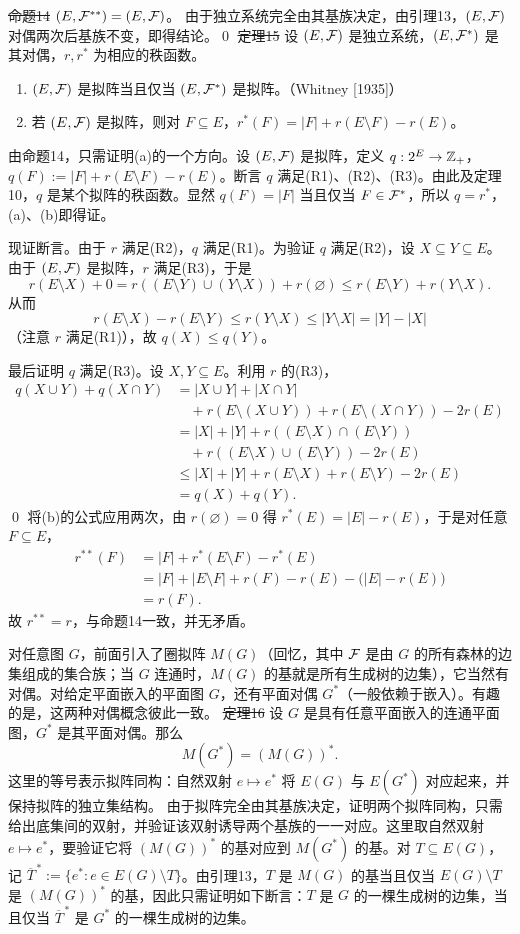 \st{命题14} $(E,\mathcal F^{**})=(E,\mathcal F)$。
\pr 由于独立系统完全由其基族决定，由引理13，$(E,\mathcal F)$ 对偶两次后基族不变，即得结论。\qed
\st{定理15} 设 $(E,\mathcal F)$ 是独立系统，$(E,\mathcal F^*)$ 是其对偶，$r,r^*$ 为相应的秩函数。
\begin{enumerate}[label=(\alph*)]
\item $(E,\mathcal F)$ 是拟阵当且仅当 $(E,\mathcal F^*)$ 是拟阵。（Whitney [1935]）
\item 若 $(E,\mathcal F)$ 是拟阵，则对 $F\subseteq E$，$r^*(F)=|F|+r(E\setminus F)-r(E)$。
\end{enumerate}
\pr 由命题14，只需证明(a)的一个方向。设 $(E,\mathcal F)$ 是拟阵，定义 $q:2^E\to\mathbb Z_+$，$q(F):=|F|+r(E\setminus F)-r(E)$。断言 $q$ 满足(R1)、(R2)、(R3)。由此及定理10，$q$ 是某个拟阵的秩函数。显然 $q(F)=|F|$ 当且仅当 $F\in\mathcal F^*$，所以 $q=r^*$，(a)、(b)即得证。

现证断言。由于 $r$ 满足(R2)，$q$ 满足(R1)。为验证 $q$ 满足(R2)，设 $X\subseteq Y\subseteq E$。由于 $(E,\mathcal F)$ 是拟阵，$r$ 满足(R3)，于是
\[r(E\setminus X)+0=r((E\setminus Y)\cup(Y\setminus X))+r(\varnothing)
\le r(E\setminus Y)+r(Y\setminus X).\]
从而
\[r(E\setminus X)-r(E\setminus Y)\le r(Y\setminus X)\le|Y\setminus X|=|Y|-|X|\]
（注意 $r$ 满足(R1)），故 $q(X)\le q(Y)$。

最后证明 $q$ 满足(R3)。设 $X,Y\subseteq E$。利用 $r$ 的(R3)，
\begin{align*}
q(X\cup Y)+q(X\cap Y)
&=|X\cup Y|+|X\cap Y|\\
&\quad+r(E\setminus(X\cup Y))+r(E\setminus(X\cap Y))-2r(E)\\
&=|X|+|Y|+r((E\setminus X)\cap(E\setminus Y))\\
&\quad+r((E\setminus X)\cup(E\setminus Y))-2r(E)\\
&\le|X|+|Y|+r(E\setminus X)+r(E\setminus Y)-2r(E)\\
&=q(X)+q(Y).
\end{align*}\qed
将(b)的公式应用两次，由 $r(\varnothing)=0$ 得 $r^*(E)=|E|-r(E)$，于是对任意 $F\subseteq E$，
\begin{align*}
r^{**}(F)&=|F|+r^*(E\setminus F)-r^*(E)\\
&=|F|+|E\setminus F|+r(F)-r(E)-\bigl(|E|-r(E)\bigr)\\
&=r(F).
\end{align*}
故 $r^{**}=r$，与命题14一致，并无矛盾。

对任意图 $G$，前面引入了圈拟阵 $M(G)$（回忆，其中 $\mathcal F$ 是由 $G$ 的所有森林的边集组成的集合族；当 $G$ 连通时，$M(G)$ 的基就是所有生成树的边集），它当然有对偶。对给定平面嵌入的平面图 $G$，还有平面对偶 $G^*$（一般依赖于嵌入）。有趣的是，这两种对偶概念彼此一致。
\st{定理16} 设 $G$ 是具有任意平面嵌入的连通平面图，$G^*$ 是其平面对偶。那么
\[M(G^*)=(M(G))^*.\]
这里的等号表示拟阵同构：自然双射 $e\mapsto e^*$ 将 $E(G)$ 与 $E(G^*)$ 对应起来，并保持拟阵的独立集结构。
\pr 由于拟阵完全由其基族决定，证明两个拟阵同构，只需给出底集间的双射，并验证该双射诱导两个基族的一一对应。这里取自然双射 $e\mapsto e^*$，要验证它将 $(M(G))^*$ 的基对应到 $M(G^*)$ 的基。对 $T\subseteq E(G)$，记 $\overline T^{\,*}:=\{e^*:e\in E(G)\setminus T\}$。由引理13，$T$ 是 $M(G)$ 的基当且仅当 $E(G)\setminus T$ 是 $(M(G))^*$ 的基，因此只需证明如下断言：$T$ 是 $G$ 的一棵生成树的边集，当且仅当 $\overline T^{\,*}$ 是 $G^*$ 的一棵生成树的边集。

